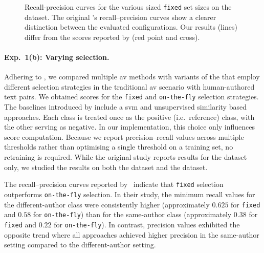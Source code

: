 
\begin{figure}[htbp]
    \centering
    
    \caption[Recall-precision curves for the various sized \imp{} set sizes]{Recall-precision curves for the various sized \texttt{fixed} \imp{} set sizes on the \dataBlog{} dataset.
    The original \impAppr{}’s recall–precision curves show a clearer distinction between the evaluated configurations.
    Our results (lines) differ from the scores reported by \citet{koppel_determining_2014} (red point and cross).
    }
    \label{fig:blog_dif_n}
\end{figure}


\paragraph{Exp.\ 1(b): Varying \imp{} selection.}

Adhering to \citet{koppel_determining_2014}, we compared multiple \ac{av} methods with variants of the \impAppr{} that employ different \imp{} selection strategies in the traditional \ac{av} scenario with human-authored text pairs.
We obtained scores for the \texttt{fixed} and \texttt{on-the-fly} \imp{} selection strategies. 
The baselines introduced by \citet{koppel_determining_2014} include a \ac{svm} and unsupervised similarity based approaches.
Each class is treated once as the positive (i.e.\ reference) class, with the other serving as negative. 
In our implementation, this choice only influences score computation. 
Because we report precision–recall values across multiple thresholds rather than optimising a single threshold on a training set, no retraining is required.
While the original study reports results for the \dataBlog{} dataset only, we studied the results on both the \dataBlog{} dataset and the \dataStudent{} dataset.

The recall–precision curves reported by \citet{koppel_determining_2014}\ indicate that \texttt{fixed} \imp{} selection outperforms \texttt{on-the-fly} \imp{} selection.
In their study, the minimum recall values for the different-author class were consistently higher (approximately $0.625$ for \texttt{fixed} and $0.58$ for \texttt{on-the-fly}) than for the same-author class (approximately $0.38$ for \texttt{fixed} and $0.22$ for \texttt{on-the-fly}).
In contrast, precision values exhibited the opposite trend where all approaches achieved higher precision in the same-author setting compared to the different-author setting.

